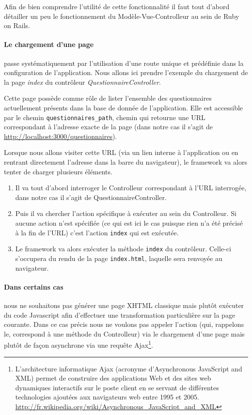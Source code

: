 \documentclass[12pt,a4paper]{book}
\begin{document}
Afin de bien comprendre l'utilité de cette fonctionnalité il faut tout d'abord détailler un peu le fonctionnement du Modèle-Vue-Controlleur au sein de Ruby on Rails.

\paragraph{Le chargement d'une page} passe systématiquement par l'utilisation d'une route unique et prédéfinie dans la configuration de l'application. Nous allons ici prendre l'exemple du chargement de la page \textit{index} du contrôleur \textit{QuestionnaireController}.

Cette page possède comme rôle de lister l'ensemble des questionnaires actuellement présents dans la base de donnée de l'application. Elle est accessible par le chemin \texttt{questionnaires\_path}, chemin qui retourne une URL correspondant à l'adresse exacte de la page (dans notre cas il s'agit de \url{http://localhost:3000/questionnaires}).

Lorsque nous allons visiter cette URL (via un lien interne à l'application ou en rentrant directement l'adresse dans la barre du navigateur), le framework va alors tenter de charger plusieurs éléments.

\begin{enumerate}
  \item Il va tout d'abord interroger le Controlleur correspondant à l'URL interrogée, dans notre cas il s'agit de QuestionnaireController.
  \item Puis il va chercher l'action spécifique à exécuter au sein du Controlleur. Si aucune action n'est spécifiée (ce qui est ici le cas puisque rien n'a été précisé à la fin de l'URL) c'est l'action \texttt{index} qui est exécutée.
  \item Le framework va alors exécuter la méthode \texttt{index} du contrôleur. Celle-ci s'occupera du rendu de la page \texttt{index.html}, laquelle sera renvoyée au navigateur.
\end{enumerate}

\paragraph{Dans certains cas} nous ne souhaitons pas générer une page XHTML classique mais plutôt exécuter du code Javascript afin d'effectuer une transformation particulière sur la page courante. Dans ce cas précis nous ne voulons pas appeler l'action (qui, rappelons le, correspond à une méthode du Controlleur) via le chargement d'une page mais plutôt de façon asynchrone via une requête Ajax\footnote{L'architecture informatique Ajax (acronyme d'Asynchronous JavaScript and XML) permet de construire des applications Web et des sites web dynamiques interactifs sur le poste client en se servant de différentes technologies ajoutées aux navigateurs web entre 1995 et 2005. \url{http://fr.wikipedia.org/wiki/Asynchronous_JavaScript_and_XML}}. 
\end{document}
